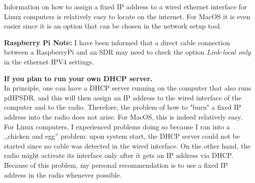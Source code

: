 \documentclass[12pt]{book}
\def\pH{pi\-HPSDR\xspace}
\begin{document}
Information on how to assign a fixed IP address to a wired ethernet interface for Linux computers
is relatively easy to locate on the internet. For MacOS it is even easier since it is an option that
can be chosen in the network setup tool.

\textbf{Raspberry Pi Note:} I have been informed that a direct cable connection between a RaspberryPi
and an SDR may need to check the option \textit{Link-local only} in the ethernet IPV4 settings.

\textbf{If you plan to run your own DHCP server.}\\
In principle, one can have a DHCP server running on the computer that also runs \pH, and this
will then assign an IP address to the wired interface of the computer and to the
radio. Therefore, the problem of how to "burn" a fixed IP address into the radio does not arise. For MacOS, this
is indeed relatively easy. For Linux computers, I experienced problems doing so because I ran into a
,,chicken and egg'' problem: upon system start, the DHCP server could not be started since no cable was
detected in the wired interface. On the other hand, the radio might activate its interface only after
it gets an IP address via DHCP. Because of this problem, my personal recommendation is to use a fixed
IP address in the radio whenever possible.



\begin{center}
\fbox{
\parbox{\textwidth - 4cm}{
\begin{center}
\textbf{\color{red} ----- End of the \pH manual -----}
\end{center}
}
}
\end{center}
\end{document}
